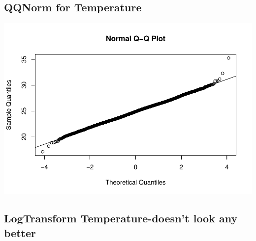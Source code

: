 \documentclass[12pt,]{article}
\newenvironment{Shaded}{\begin{snugshade}}{\end{snugshade}}
\newcommand{\KeywordTok}[1]{\textcolor[rgb]{0.13,0.29,0.53}{\textbf{#1}}}
\newcommand{\OperatorTok}[1]{\textcolor[rgb]{0.81,0.36,0.00}{\textbf{#1}}}
\newcommand{\NormalTok}[1]{#1}
\begin{document}
\subsection{QQNorm for Temperature}\label{qqnorm-for-temperature}

\begin{Shaded}
\end{Shaded}

\includegraphics{Garcia_ENV872_Project_files/figure-latex/unnamed-chunk-22-1.pdf}

\subsection{LogTransform Temperature-doesn't look any
better}\label{logtransform-temperature-doesnt-look-any-better}

\begin{Shaded}
\end{Shaded}
\end{document}
